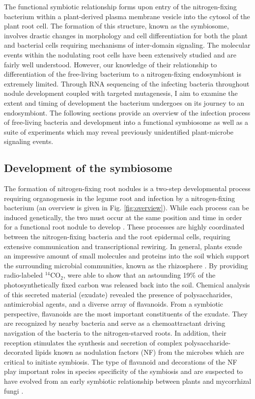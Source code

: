 The functional symbiotic relationship forms upon entry of the nitrogen-fixing
bacterium within a plant-derived plasma membrane vesicle into the cytosol of the
plant root cell. The formation of this structure, known as the symbiosome,
involves drastic changes in morphology and cell differentiation for both the
plant and bacterial cells requiring mechanisms of inter-domain signaling. The
molecular events within the nodulating root cells have been extensively studied
and are fairly well understood. However, our knowledge of their relationship to
differentiation of the free-living bacterium to a nitrogen-fixing endosymbiont
is extremely limited. Through RNA sequencing of the infecting bacteria throughout nodule
development coupled with targeted  mutagenesis, I aim to examine the extent and
timing of development the bacterium undergoes on its journey to an endosymbiont.
The following sections provide an overview of the infection process of
free-living bacteria and development into a functional symbiosome as well as a
suite of experiments which may reveal previously
unidentified plant-microbe signaling events.

\subsection*{Development of the symbiosome} 
\indent The formation of nitrogen-fixing root nodules is a two-step developmental
process requiring organogenesis in the legume root and infection by a
nitrogen-fixing bacterium (an overview is given in Fig. \ref{fig:overview}). While each 
process can be induced genetically,  the two must occur at the same
position and time in order for a functional root nodule to develop
\cite{Oldroyd:2008hd}.  These processes are highly coordinated between the
nitrogen-fixing bacteria and the root epidermal cells, requiring extensive
communication and transcriptional rewiring. In general, plants exude an
impressive amount of small molecules and proteins into the soil which support
the surrounding microbial communities,
known as the rhizosphere \cite{Perret:2000ue}. By providing radio-labeled
$^{14}$CO$_2$, \citet{Helal:1988tq} were able to show that an astounding 19\% of
the photosynthetically fixed carbon was released back into the soil. Chemical
analysis of this secreted material (exudate) revealed the presence of 
polysaccharides, antimicrobial agents, and a diverse array of
flavanoids. From a symbiotic perspective, flavanoids are the most
important constituents of the exudate. They are recognized by nearby bacteria
and serve as a chemoattractant \cite{Zuanazzi:1998vk, Hirsch:1992vo} driving
navigation of the bacteria to the nitrogen-starved roots. In
addition, their reception  
stimulates the synthesis and secretion of complex
polysaccharide-decorated lipids known as nodulation factors (NF) from
the microbes which are critical to initiate symbiosis. The type of flavanoid
and decorations of the NF play important roles in species specificity of the
symbiosis \cite{Perret:2000ue, Oldroyd:2011ej, Denarie:1996ts} and are suspected
to have evolved from an early symbiotic relationship between plants and
mycorrhizal fungi \cite{Parniske:2008jx}.

